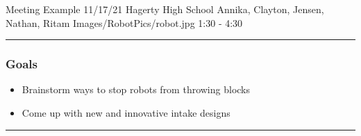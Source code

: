 \insertmeeting 
	{Meeting Example} 
	{11/17/21}
	{Hagerty High School}
	{Annika, Clayton, Jensen, Nathan, Ritam}
	{Images/RobotPics/robot.jpg}
	{1:30 - 4:30}
	
\noindent\hfil\rule{\textwidth}{.4pt}\hfil
\subsubsection*{Goals}
\begin{itemize}
    \item Brainstorm ways to stop robots from throwing blocks
    \item Come up with new and innovative intake designs


\end{itemize} 

\noindent\hfil\rule{\textwidth}{.4pt}\hfil

